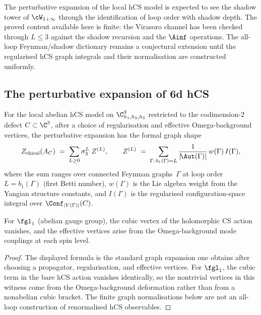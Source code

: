 The perturbative expansion of the local hCS model is expected to see the
shadow tower of $\cW_{1+\infty}$ through the identification of loop order
with shadow depth. The proved content available here is finite:
the Virasoro channel has been checked through $L\leq 3$ against the
shadow recursion and the $\Ainf$ operations. The all-loop
Feynman/shadow dictionary remains a conjectural extension until the
regularised hCS graph integrals and their normalisation are constructed
uniformly.

\subsection{The perturbative expansion of 6d hCS}
\label{subsec:perturbative-expansion-6d}

\begin{proposition}
\label{prop:perturbative-chiral-expansion}
For the local abelian hCS model on $\C^3_{h_1,h_2,h_3}$ restricted to
the codimension-$2$ defect $C \subset \C^3$, after a choice of
regularisation and effective Omega-background vertices, the perturbative
expansion has the formal graph shape
\begin{equation}\label{eq:perturbative-expansion}
 Z_{\mathrm{chiral}}(A_C) \;=\; \sum_{L \geq 0} \sigma_3^L \; Z^{(L)},
 \qquad
 Z^{(L)} \;=\; \sum_{\Gamma:\, b_1(\Gamma) = L}
 \frac{1}{|\!\Aut(\Gamma)|}\, w(\Gamma)\, I(\Gamma),
\end{equation}
where the sum ranges over connected Feynman graphs~$\Gamma$ at loop order~$L = b_1(\Gamma)$ (first Betti number), $w(\Gamma)$ is the Lie algebra weight from the Yangian structure constants, and $I(\Gamma)$ is the regularised configuration-space integral over $\Conf_{|V(\Gamma)|}(C)$.

For $\fgl_1$ (abelian gauge group), the cubic vertex of the holomorphic CS action vanishes, and the effective vertices arise from the Omega-background mode couplings at each spin level.
\end{proposition}

\begin{proof}
The displayed formula is the standard graph expansion one obtains after
choosing a propagator, regularisation, and effective vertices. For
$\fgl_1$, the cubic term in the bare hCS action vanishes identically, so
the nontrivial vertices in this witness come from the Omega-background
deformation rather than from a nonabelian cubic bracket. The finite graph
normalisations below are not an all-loop construction of renormalised
hCS observables.
\end{proof}

